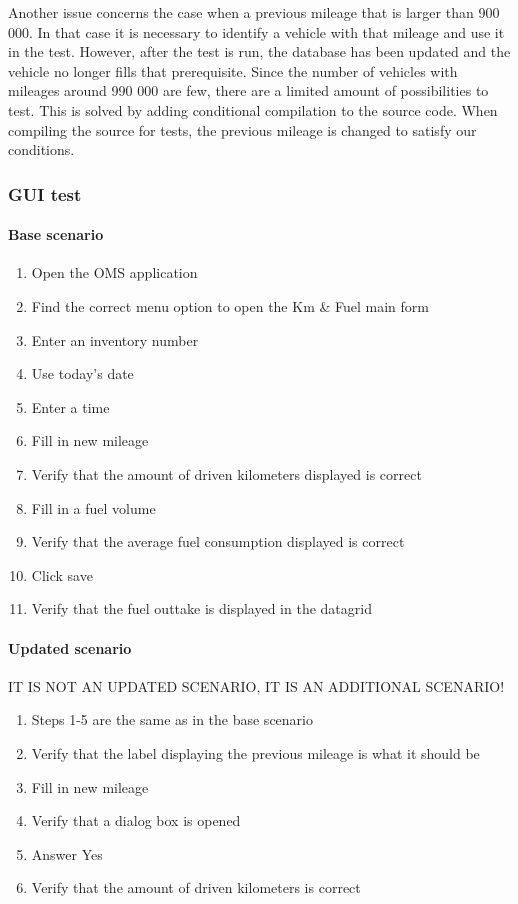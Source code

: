 \documentclass{article}
\begin{document}
			Another issue concerns the case when a previous mileage that is larger than 900 000. In that case it is necessary to identify a vehicle with that mileage and use it in the test.
			However, after the test is run, the database has been updated and the vehicle no longer fills that prerequisite. Since the number of vehicles with mileages around 990 000 are few, there are a limited amount of possibilities to test.
			This is solved by adding conditional compilation to the source code. When compiling the source for tests, the previous mileage is changed to satisfy our conditions.

			\subsubsection{GUI test}

			\paragraph{Base scenario}

			\begin{enumerate}
				\item Open the OMS application
				\item Find the correct menu option to open the Km \& Fuel main form
				\item Enter an inventory number
				\item Use today's date
				\item Enter a time
				\item Fill in new mileage
				\item Verify that the amount of driven kilometers displayed is correct
				\item Fill in a fuel volume
				\item Verify that the average fuel consumption displayed is correct
				\item Click save
				\item Verify that the fuel outtake is displayed in the datagrid
			\end{enumerate}
				
			\paragraph{Updated scenario}

			IT IS NOT AN UPDATED SCENARIO, IT IS AN ADDITIONAL SCENARIO!

			\begin{enumerate}
				\item Steps 1-5 are the same as in the base scenario
				\setcounter{enumi}{5}
				\item Verify that the label displaying the previous mileage is what it should be
				\item Fill in new mileage
				\item Verify that a dialog box is opened
				\item Answer Yes
				\item Verify that the amount of driven kilometers is correct
			\end{enumerate}
\end{document}
